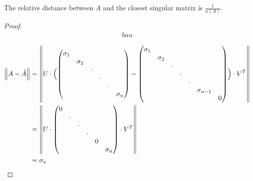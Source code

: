 \documentclass[computationalMathematics.tex]{subfiles}
\begin{document}
\begin{proposition}
The relative distance between $A$ and the closest singular matrix is $\frac{1}{\kappa(A)}$.
\end{proposition}
\begin{proof}


\begin{equation}
  \begin{aligned}
bau
  \end{aligned}
\end{equation}

\begin{equation}
  \begin{aligned}
    \left\lVert A - \hat{A}\right\rVert &= \left\lVert U \cdot 
    \Bigl(
    \begin{pmatrix}
      \sigma_1 &&&&&\\
      & \sigma_2&&&&\\
      && \cdot&&&\\
      &&& \cdot&&\\
      &&&& \cdot&\\
      &&&&& \sigma_n\\
    \end{pmatrix} -
    \begin{pmatrix}
      \sigma_1 &&&&&\\
      & \sigma_2&&&&\\
      && \cdot&&&\\
      &&& \cdot&&\\
      &&&& \cdot&\\
      &&&&& \sigma_{n-1}\\
      &&&&&& 0\\
    \end{pmatrix} \Bigr) \cdot {V}^{T}\right\rVert\\
    &= \left\lVert U \cdot 
    \begin{pmatrix}
      0 &&&&&\\
      & \cdot &&&&\\
      && \cdot&&&\\
      &&& \cdot&&\\
      &&&& 0&\\
      &&&&& \sigma_n\\
    \end{pmatrix} \cdot {V}^{T}\right\rVert\\
    &= \sigma_n\\
  \end{aligned}
\end{equation}


\end{proof}
\end{document}
